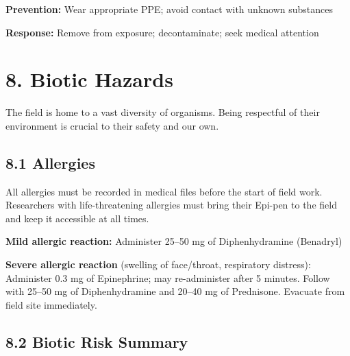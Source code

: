 \documentclass[
  11pt,
  letterpaper,
]{article}
\begin{document}
\textbf{Prevention:} Wear appropriate PPE; avoid contact with unknown
substances

\textbf{Response:} Remove from exposure; decontaminate; seek medical
attention

\section{8. Biotic Hazards}\label{biotic-hazards}

The field is home to a vast diversity of organisms. Being respectful of
their environment is crucial to their safety and our own.

\subsection{8.1 Allergies}\label{allergies}

\begin{tcolorbox}[enhanced jigsaw, colback=white, titlerule=0mm, leftrule=.75mm, left=2mm, toptitle=1mm, rightrule=.15mm, title=\textcolor{quarto-callout-important-color}{\faExclamation}\hspace{0.5em}{Important}, opacitybacktitle=0.6, bottomrule=.15mm, breakable, opacityback=0, colframe=quarto-callout-important-color-frame, coltitle=black, arc=.35mm, bottomtitle=1mm, colbacktitle=quarto-callout-important-color!10!white, toprule=.15mm]

All allergies must be recorded in medical files before the start of
field work. Researchers with life-threatening allergies must bring their
Epi-pen to the field and keep it accessible at all times.

\end{tcolorbox}

\textbf{Mild allergic reaction:} Administer 25--50 mg of Diphenhydramine
(Benadryl)

\textbf{Severe allergic reaction} (swelling of face/throat, respiratory
distress): Administer 0.3 mg of Epinephrine; may re-administer after 5
minutes. Follow with 25--50 mg of Diphenhydramine and 20--40 mg of
Prednisone. Evacuate from field site immediately.

\subsection{8.2 Biotic Risk Summary}\label{biotic-risk-summary}
\end{document}
